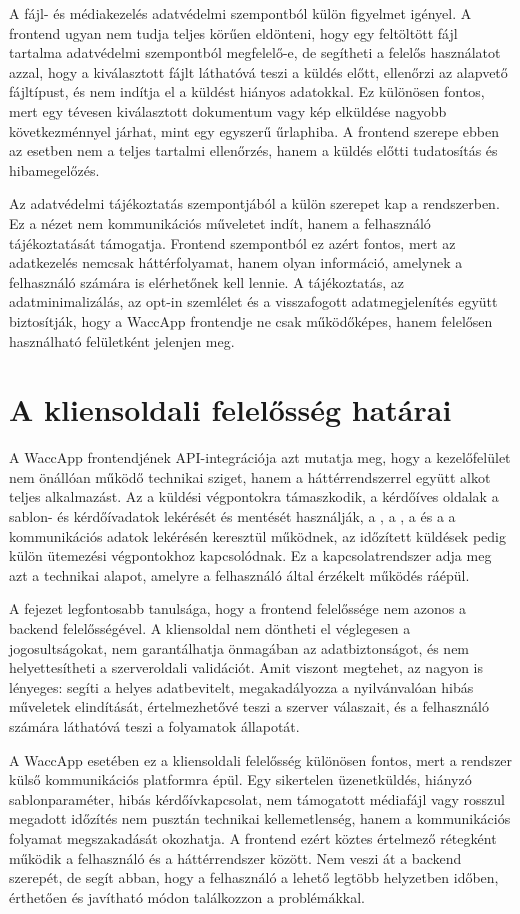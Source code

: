 A fájl- és médiakezelés adatvédelmi szempontból külön figyelmet igényel. A frontend ugyan nem tudja teljes körűen eldönteni, hogy egy feltöltött fájl tartalma adatvédelmi szempontból megfelelő-e, de segítheti a felelős használatot azzal, hogy a kiválasztott fájlt láthatóvá teszi a küldés előtt, ellenőrzi az alapvető fájltípust, és nem indítja el a küldést hiányos adatokkal. Ez különösen fontos, mert egy tévesen kiválasztott dokumentum vagy kép elküldése nagyobb következménnyel járhat, mint egy egyszerű űrlaphiba. A frontend szerepe ebben az esetben nem a teljes tartalmi ellenőrzés, hanem a küldés előtti tudatosítás és hibamegelőzés.

Az adatvédelmi tájékoztatás szempontjából a  külön szerepet kap a rendszerben. Ez a nézet nem kommunikációs műveletet indít, hanem a felhasználó tájékoztatását támogatja. Frontend szempontból ez azért fontos, mert az adatkezelés nemcsak háttérfolyamat, hanem olyan információ, amelynek a felhasználó számára is elérhetőnek kell lennie. A tájékoztatás, az adatminimalizálás, az opt-in szemlélet és a visszafogott adatmegjelenítés együtt biztosítják, hogy a WaccApp frontendje ne csak működőképes, hanem felelősen használható felületként jelenjen meg.

\section{A kliensoldali felelősség határai}

A WaccApp frontendjének API-integrációja azt mutatja meg, hogy a kezelőfelület nem önállóan működő technikai sziget, hanem a háttérrendszerrel együtt alkot teljes alkalmazást. Az  a küldési végpontokra támaszkodik, a kérdőíves oldalak a sablon- és kérdőívadatok lekérését és mentését használják, a , a , a  és a  a kommunikációs adatok lekérésén keresztül működnek, az időzített küldések pedig külön ütemezési végpontokhoz kapcsolódnak. Ez a kapcsolatrendszer adja meg azt a technikai alapot, amelyre a felhasználó által érzékelt működés ráépül. 

A fejezet legfontosabb tanulsága, hogy a frontend felelőssége nem azonos a backend felelősségével. A kliensoldal nem döntheti el véglegesen a jogosultságokat, nem garantálhatja önmagában az adatbiztonságot, és nem helyettesítheti a szerveroldali validációt. Amit viszont megtehet, az nagyon is lényeges: segíti a helyes adatbevitelt, megakadályozza a nyilvánvalóan hibás műveletek elindítását, értelmezhetővé teszi a szerver válaszait, és a felhasználó számára láthatóvá teszi a folyamatok állapotát. 

A WaccApp esetében ez a kliensoldali felelősség különösen fontos, mert a rendszer külső kommunikációs platformra épül. Egy sikertelen üzenetküldés, hiányzó sablonparaméter, hibás kérdőívkapcsolat, nem támogatott médiafájl vagy rosszul megadott időzítés nem pusztán technikai kellemetlenség, hanem a kommunikációs folyamat megszakadását okozhatja. A frontend ezért köztes értelmező rétegként működik a felhasználó és a háttérrendszer között. Nem veszi át a backend szerepét, de segít abban, hogy a felhasználó a lehető legtöbb helyzetben időben, érthetően és javítható módon találkozzon a problémákkal. 
